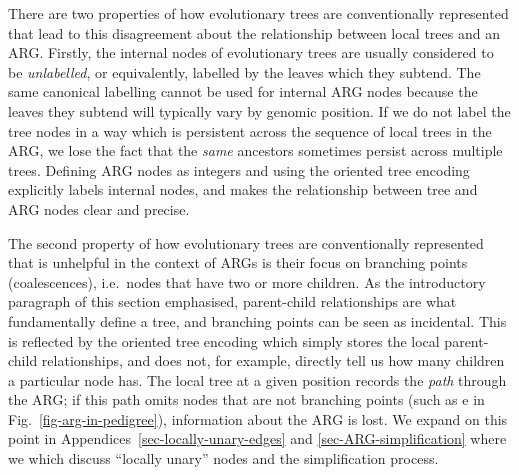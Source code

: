 \documentclass{article}
\newcommand{\noderef}[1]{\textsf{#1}}
\begin{document}
There are two properties of how evolutionary trees are conventionally
represented that lead to this
disagreement about the relationship between local trees and an ARG.
Firstly, the internal nodes of evolutionary trees are usually considered to be
\emph{unlabelled}, or equivalently, labelled by the leaves which they subtend.
The same canonical labelling cannot be used for internal ARG nodes because the
leaves they subtend will typically vary by genomic position. If we do not label
the tree nodes in a way which is persistent across the sequence of local trees
in the ARG, we lose the fact that the \emph{same} ancestors sometimes persist
across multiple trees.
Defining ARG nodes as integers and using the oriented
tree encoding explicitly labels internal nodes, and makes the relationship
between tree and ARG nodes clear and precise.

The second property of how evolutionary trees
are conventionally represented that is unhelpful in the context of ARGs is their
focus on branching points (coalescences), i.e.\ nodes that have two or more children.
As the introductory paragraph of this section emphasised,
parent-child relationships are what fundamentally define a tree,
and branching points can be seen as incidental. This is reflected
by the oriented tree encoding which simply stores the local
parent-child relationships, and does not, for example,
directly tell us how many children a particular node has.
The local tree at a given position records the \emph{path} through
the ARG; if this path omits nodes that are not
branching points (such as \noderef{e} in Fig.~\ref{fig-arg-in-pedigree}),
information about the ARG is lost.
We expand on this point in Appendices~\ref{sec-locally-unary-edges} and
\ref{sec-ARG-simplification}
where we which discuss ``locally unary'' nodes and the simplification process.
\end{document}
